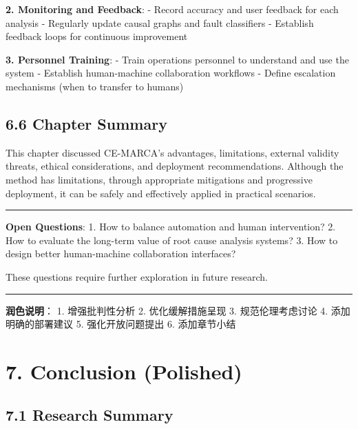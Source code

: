 \textbf{2. Monitoring and Feedback}: - Record accuracy and user feedback
for each analysis - Regularly update causal graphs and fault classifiers
- Establish feedback loops for continuous improvement

\textbf{3. Personnel Training}: - Train operations personnel to
understand and use the system - Establish human-machine collaboration
workflows - Define escalation mechanisms (when to transfer to humans)

\hypertarget{chapter-summary-2}{%
\subsection{6.6 Chapter Summary}\label{chapter-summary-2}}

This chapter discussed CE-MARCA's advantages, limitations, external
validity threats, ethical considerations, and deployment
recommendations. Although the method has limitations, through
appropriate mitigations and progressive deployment, it can be safely and
effectively applied in practical scenarios.

\begin{center}\rule{0.5\linewidth}{0.5pt}\end{center}

\textbf{Open Questions}: 1. How to balance automation and human
intervention? 2. How to evaluate the long-term value of root cause
analysis systems? 3. How to design better human-machine collaboration
interfaces?

These questions require further exploration in future research.

\begin{center}\rule{0.5\linewidth}{0.5pt}\end{center}

\textbf{润色说明}： 1. 增强批判性分析 2. 优化缓解措施呈现 3.
规范伦理考虑讨论 4. 添加明确的部署建议 5. 强化开放问题提出 6.
添加章节小结

\hypertarget{conclusion-polished}{%
\section{7. Conclusion (Polished)}\label{conclusion-polished}}

\hypertarget{research-summary}{%
\subsection{7.1 Research Summary}\label{research-summary}}

